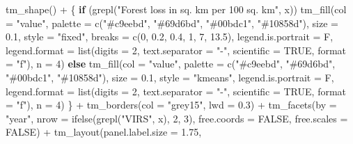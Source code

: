 \documentclass[10pt,landscape,a3paper]{article}
\newenvironment{Shaded}{\begin{snugshade}}{\end{snugshade}}
\newcommand{\AttributeTok}[1]{\textcolor[rgb]{0.77,0.63,0.00}{#1}}
\newcommand{\ConstantTok}[1]{\textcolor[rgb]{0.00,0.00,0.00}{#1}}
\newcommand{\ControlFlowTok}[1]{\textcolor[rgb]{0.13,0.29,0.53}{\textbf{#1}}}
\newcommand{\DecValTok}[1]{\textcolor[rgb]{0.00,0.00,0.81}{#1}}
\newcommand{\FloatTok}[1]{\textcolor[rgb]{0.00,0.00,0.81}{#1}}
\newcommand{\FunctionTok}[1]{\textcolor[rgb]{0.00,0.00,0.00}{#1}}
\newcommand{\NormalTok}[1]{#1}
\newcommand{\SpecialCharTok}[1]{\textcolor[rgb]{0.00,0.00,0.00}{#1}}
\newcommand{\StringTok}[1]{\textcolor[rgb]{0.31,0.60,0.02}{#1}}
\begin{document}
\begin{Shaded}
\begin{Highlighting}[]
        \FunctionTok{tm\_shape}\NormalTok{() }\SpecialCharTok{+}\NormalTok{ \{}
        \ControlFlowTok{if}\NormalTok{ (}\FunctionTok{grepl}\NormalTok{(}\StringTok{"Forest loss in sq. km per 100 sq. km"}\NormalTok{, x)) }\FunctionTok{tm\_fill}\NormalTok{(}\AttributeTok{col =} \StringTok{"value"}\NormalTok{,}
            \AttributeTok{palette =} \FunctionTok{c}\NormalTok{(}\StringTok{"\#c9eebd"}\NormalTok{, }\StringTok{"\#69d6bd"}\NormalTok{, }\StringTok{"\#00bdc1"}\NormalTok{, }\StringTok{"\#10858d"}\NormalTok{), }\AttributeTok{size =} \FloatTok{0.1}\NormalTok{,}
            \AttributeTok{style =} \StringTok{"fixed"}\NormalTok{, }\AttributeTok{breaks =} \FunctionTok{c}\NormalTok{(}\DecValTok{0}\NormalTok{, }\FloatTok{0.2}\NormalTok{, }\FloatTok{0.4}\NormalTok{, }\DecValTok{1}\NormalTok{, }\DecValTok{7}\NormalTok{, }\FloatTok{13.5}\NormalTok{), }\AttributeTok{legend.is.portrait =}\NormalTok{ F,}
            \AttributeTok{legend.format =} \FunctionTok{list}\NormalTok{(}\AttributeTok{digits =} \DecValTok{2}\NormalTok{, }\AttributeTok{text.separator =} \StringTok{"{-}"}\NormalTok{, }\AttributeTok{scientific =} \ConstantTok{TRUE}\NormalTok{,}
                \AttributeTok{format =} \StringTok{"f"}\NormalTok{), }\AttributeTok{n =} \DecValTok{4}\NormalTok{) }\ControlFlowTok{else} \FunctionTok{tm\_fill}\NormalTok{(}\AttributeTok{col =} \StringTok{"value"}\NormalTok{, }\AttributeTok{palette =} \FunctionTok{c}\NormalTok{(}\StringTok{"\#c9eebd"}\NormalTok{,}
            \StringTok{"\#69d6bd"}\NormalTok{, }\StringTok{"\#00bdc1"}\NormalTok{, }\StringTok{"\#10858d"}\NormalTok{), }\AttributeTok{size =} \FloatTok{0.1}\NormalTok{, }\AttributeTok{style =} \StringTok{"kmeans"}\NormalTok{, }\AttributeTok{legend.is.portrait =}\NormalTok{ F,}
            \AttributeTok{legend.format =} \FunctionTok{list}\NormalTok{(}\AttributeTok{digits =} \DecValTok{2}\NormalTok{, }\AttributeTok{text.separator =} \StringTok{"{-}"}\NormalTok{, }\AttributeTok{scientific =} \ConstantTok{TRUE}\NormalTok{,}
                \AttributeTok{format =} \StringTok{"f"}\NormalTok{), }\AttributeTok{n =} \DecValTok{4}\NormalTok{)}
\NormalTok{    \} }\SpecialCharTok{+} \FunctionTok{tm\_borders}\NormalTok{(}\AttributeTok{col =} \StringTok{"grey15"}\NormalTok{, }\AttributeTok{lwd =} \FloatTok{0.3}\NormalTok{) }\SpecialCharTok{+} \FunctionTok{tm\_facets}\NormalTok{(}\AttributeTok{by =} \StringTok{"year"}\NormalTok{, }\AttributeTok{nrow =} \FunctionTok{ifelse}\NormalTok{(}\FunctionTok{grepl}\NormalTok{(}\StringTok{"VIRS"}\NormalTok{,}
\NormalTok{        x), }\DecValTok{2}\NormalTok{, }\DecValTok{3}\NormalTok{), }\AttributeTok{free.coords =} \ConstantTok{FALSE}\NormalTok{, }\AttributeTok{free.scales =} \ConstantTok{FALSE}\NormalTok{) }\SpecialCharTok{+} \FunctionTok{tm\_layout}\NormalTok{(}\AttributeTok{panel.label.size =} \FloatTok{1.75}\NormalTok{,}

\end{Highlighting}
\end{Shaded}
\end{document}

